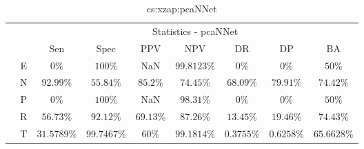 \begin{table}[!ht]
	\centering
	\begin{tabular}{|c|c|c|c|c|c|c|c|c|}
		\cline{3-9}
		\multicolumn{2}{c|}{} & \multicolumn{7}{c|}{Statistics - pcaNNet} \\ \cline{3-9}
		\multicolumn{2}{c|}{} & Sen & Spec & PPV & NPV & DR & DP & BA \\ \hline
		\multirow{5}{*}{\rotatebox{90}{Class}} & E & $0\%$ & $100\%$ & NaN & $99.8123\%$ & $0\%$ & $0\%$ & $50\%$ \\ \cline{2-9}
		 & N & $92.99\%$ & $55.84\%$ & $85.2\%$ & $74.45\%$ & $68.09\%$ & $79.91\%$ & $74.42\%$ \\ \cline{2-9}
		 & P & $0\%$ & $100\%$ & NaN & $98.31\%$ & $0\%$ & $0\%$ & $50\%$ \\ \cline{2-9}
		 & R & $56.73\%$ & $92.12\%$ & $69.13\%$ & $87.26\%$ & $13.45\%$ & $19.46\%$ & $74.43\%$ \\ \cline{2-9}
		 & T & $31.5789\%$ & $99.7467\%$ & $60\%$ & $99.1814\%$ & $0.3755\%$ & $0.6258\%$ & $65.6628\%$ \\ \hline
	\end{tabular}
	\caption{cs:xzap:pcaNNet}
	\label{tab:cs:xzap:pcaNNet}
\end{table}
